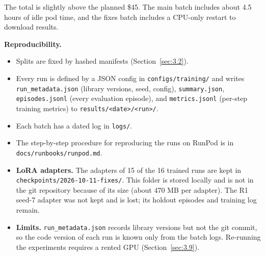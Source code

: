 The total is slightly above the planned \$45. The main batch includes
about 4.5 hours of idle pod time, and the fixes batch includes a
CPU-only restart to download results.

\textbf{Reproducibility.}

\begin{itemize}
\tightlist
\item
  Splits are fixed by hashed manifests (Section~\ref{sec:3.2}).
\item
  Every run is defined by a JSON config in
  \texttt{configs/\allowbreak{}training/\allowbreak{}} and writes
  \texttt{run\_\allowbreak{}metadata.\allowbreak{}json} (library
  versions, seed, config), \texttt{summary.\allowbreak{}json},
  \texttt{episodes.\allowbreak{}jsonl} (every evaluation episode), and
  \texttt{metrics.\allowbreak{}jsonl} (per-step training metrics) to
  \texttt{results/\allowbreak{}<date>/\allowbreak{}<run>/\allowbreak{}}.
\item
  Each batch has a dated log in \texttt{logs/\allowbreak{}}.
\item
  The step-by-step procedure for reproducing the runs on RunPod is in
  \texttt{docs/\allowbreak{}runbooks/\allowbreak{}runpod.\allowbreak{}md}.
\item
  \textbf{LoRA adapters.} The adapters of 15 of the 16 trained runs are
  kept in
  \texttt{checkpoints/\allowbreak{}2026-\allowbreak{}10-\allowbreak{}11-\allowbreak{}fixes/\allowbreak{}}.
  This folder is stored locally and is not in the git repository because
  of its size (about 470 MB per adapter). The R1 seed-7 adapter was not
  kept and is lost; its holdout episodes and training log remain.
\item
  \textbf{Limits.} \texttt{run\_\allowbreak{}metadata.\allowbreak{}json}
  records library versions but not the git commit, so the code version
  of each run is known only from the batch logs. Re-running the
  experiments requires a rented GPU (Section~\ref{sec:3.9}).
\end{itemize}
